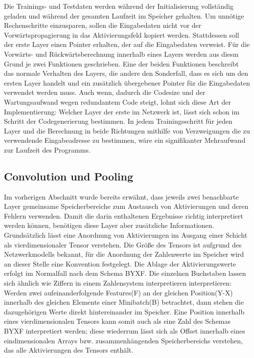\documentclass[../main.tex]{subfiles}
\begin{document}
Die Trainings- und Testdaten werden während der Initialisierung vollständig geladen und während der gesamten Laufzeit im Speicher gehalten. Um unnötige Rechenschritte einzusparen, sollen die Eingabedaten nicht vor der Vorwärtspropagierung in das Aktivierungsfeld kopiert werden. Stattdessen soll der erste Layer einen Pointer erhalten, der auf die Eingabedaten verweist. Für die Vorwärts- und Rückwärtsberechnung innerhalb eines Layers werden aus diesm Grund je zwei Funktionen geschrieben. Eine der beiden Funktionen beschreibt das normale Verhalten des Layers, die andere den Sonderfall, dass es sich um den ersten Layer handelt und ein zusätzlich übergebener Pointer für die Eingabedaten verwendet werden muss. Auch wenn, dadurch die Codesize und der Wartungsaufwand wegen redundantem Code steigt, lohnt sich diese Art der Implementierung: Welcher Layer der erste im Netzwerk ist, lässt sich schon im Schritt der Codegenerierung bestimmen. In jedem Trainingsschritt für jeden Layer und die Berechnung in beide Richtungen mithilfe von Verzweigungen die zu verwendende Eingabeadresse zu bestimmen, wäre ein signifikanter Mehraufwand zur Laufzeit des Programms. 

\subsection{Convolution und Pooling} \label{xeonphi:convnpool}
Im vorherigen Abschnitt wurde bereits erwähnt, dass jeweils zwei benachbarte Layer gemeinsame Speicherbereiche zum Austausch von Aktivierungen und deren Fehlern verwenden. Damit die darin enthaltenen Ergebnisse richtig interpretiert werden können, benötigen diese Layer aber zusätzliche Informationen. Grundsätzlich lässt eine Anordnung von Aktivierungen im Ausgang einer Schicht als vierdimensionaler Tensor verstehen. Die Größe des Tensors ist aufgrund des Netzwerkmodells bekannt, für die Anordnung der Zahlenwerte im Speicher wird an dieser Stelle eine Konvention festgelegt. Die Ablage der Aktivierungswerte erfolgt im Normalfall nach dem Schema BYXF. Die einzelnen Buchstaben lassen sich ähnlich wie Ziffern in einem Zahlensystem interpretieren interpretieren: Werden zwei aufeinanderfolgende Features(F) an der gleichen Position(Y-X) innerhalb des gleichen Elements einer Minibatch(B) betrachtet, dann stehen die dazugehörigen Werte direkt hintereinander im Speicher. Eine Position innerhalb eines vierdimensionalen Tensors kann somit auch als eine Zahl des Schemas BYXF interpretiert werden; diese wiederrum lässt sich als Offset innerhalb eines eindimensionalen Arrays bzw. zusammenhängenden Speicherbereichs verstehen, das alle Aktivierungen des Tensors enthält. 
\end{document}
